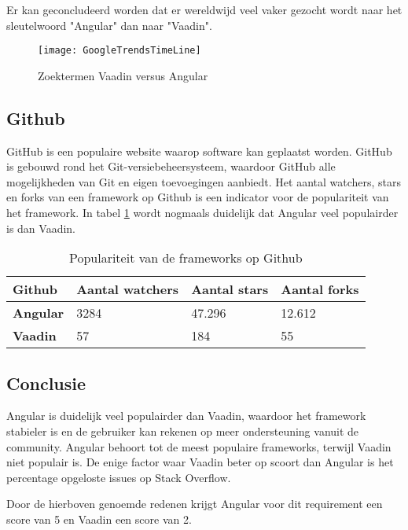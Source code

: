 Er kan geconcludeerd worden dat er wereldwijd veel vaker gezocht wordt naar het sleutelwoord "Angular" dan naar "Vaadin". 

\begin{figure}[H]
	\centering
	\texttt{[image: GoogleTrendsTimeLine]}
	\caption{Zoektermen Vaadin versus Angular \autocite{GoogleTrends2019}}
	\label{fig:Google Trends zoektermen}
\end{figure}

\subsection{Github}
GitHub is een populaire website waarop software kan geplaatst worden. GitHub is gebouwd rond het Git-versiebeheersysteem, waardoor GitHub alle mogelijkheden van Git en eigen toevoegingen aanbiedt. Het aantal watchers, stars en forks van een framework op Github is een indicator voor de populariteit van het framework. In tabel \ref{table:github} wordt nogmaals duidelijk dat Angular veel populairder is dan Vaadin.

\begin{table}[H]
	\begin{tabular}{|l|l|l|l|}
		\hline
		\textbf{Github}  & \textbf{Aantal watchers} & \textbf{Aantal stars} & \textbf{Aantal forks} \\ \hline
		\textbf{Angular} & 3284                     & 47.296                & 12.612                \\ \hline
		\textbf{Vaadin}  & 57                       & 184                   & 55                    \\ \hline
	\end{tabular}
	\caption{Populariteit van de frameworks op Github}
	\label{table:github}
\end{table}

\subsection{Conclusie}
Angular is duidelijk veel populairder dan Vaadin, waardoor het framework stabieler is en de gebruiker kan rekenen op meer ondersteuning vanuit de community. Angular behoort tot de meest populaire frameworks, terwijl Vaadin niet populair is. De enige factor waar Vaadin beter op scoort dan Angular is het percentage opgeloste issues op Stack Overflow. 

Door de hierboven genoemde redenen krijgt Angular voor dit requirement een score van 5 en Vaadin een score van 2.


